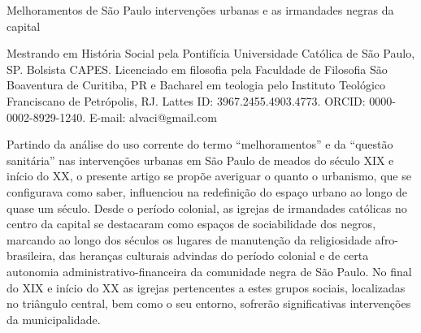\begin{refsection}
    \renewcommand{\thefigure}{\arabic{figure}}

    \chapterTwoLines
    {Melhoramentos de São Paulo}
    {intervenções urbanas e as irmandades negras da capital}
    \label{chap:melhoramentossao}
    
    {Mestrando em História Social pela Pontifícia Universidade Católica de São
    Paulo, SP. Bolsista CAPES. Licenciado em filosofia pela Faculdade de
    Filosofia São Boaventura de Curitiba, PR e Bacharel em teologia pelo
    Instituto Teológico Franciscano de Petrópolis, RJ. Lattes ID:
    3967.2455.4903.4773. ORCID: 0000-0002-8929-1240. E-mail: alvaci@gmail.com}

    \begin{galoResumo}
         Partindo da análise do uso corrente do termo ``melhoramentos'' e da
        ``questão sanitária'' nas intervenções urbanas em São Paulo de meados
        do século XIX e início do XX, o presente artigo se propõe averiguar o
        quanto o urbanismo, que se configurava como saber, influenciou na
        redefinição do espaço urbano ao longo de quase um século. Desde o
        período colonial, as igrejas de irmandades católicas no centro da
        capital se destacaram como espaços de sociabilidade dos negros,
        marcando ao longo dos séculos os lugares de manutenção da religiosidade
        afro-brasileira, das heranças culturais advindas do período colonial e
        de certa autonomia administrativo-financeira da comunidade negra de São
        Paulo. No final do XIX e início do XX as igrejas pertencentes a estes
        grupos sociais, localizadas no triângulo central, bem como o seu
        entorno, sofrerão significativas intervenções da municipalidade.

    \end{galoResumo}
    
    
    \begin{otherlanguage}{english}
    

\end{otherlanguage}
\end{refsection}
